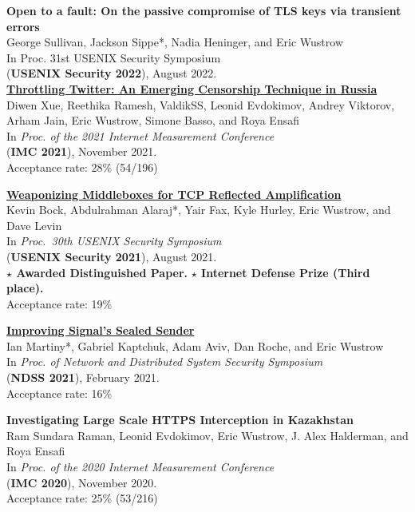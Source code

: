 \documentclass[margin,11pt]{res} %
\begin{document}
    \textbf{Open to a fault: On the passive compromise of TLS keys via transient errors} \\
    George Sullivan, Jackson Sippe*, Nadia Heninger, and Eric Wustrow \\
    In {Proc. 31st USENIX Security Symposium} \\
    (\textbf{USENIX Security 2022}), August 2022. \\


    \textbf{\href{https://throttletwitter.com/}{Throttling Twitter: An Emerging Censorship Technique in Russia}} \\
    Diwen Xue, Reethika Ramesh, ValdikSS, Leonid Evdokimov, Andrey Viktorov, Arham Jain, Eric Wustrow, Simone Basso, and Roya Ensafi \\
    In \emph{Proc. of the 2021 Internet Measurement Conference} \\
    (\textbf{IMC 2021}), November 2021. \\
    Acceptance rate: 28\% (54/196)

    \textbf{\href{https://geneva.cs.umd.edu/posts/usenix21-weaponizing-censors/}{Weaponizing Middleboxes for TCP Reflected Amplification}} \\
    Kevin Bock, Abdulrahman Alaraj*, Yair Fax, Kyle Hurley, Eric Wustrow, and Dave Levin \\
    In \emph{Proc.\ 30th USENIX Security Symposium} \\
    (\textbf{USENIX Security 2021}), August 2021. \\
    \textbf{$\star$ Awarded Distinguished Paper.} 
    \textbf{$\star$ Internet Defense Prize (Third place).} \\
    Acceptance rate: 19\% %

    \textbf{\href{https://www.ndss-symposium.org/ndss-paper/improving-signals-sealed-sender/}{Improving Signal's Sealed Sender}} \\
    Ian Martiny*, Gabriel Kaptchuk, Adam Aviv, Dan Roche, and Eric Wustrow \\
    In \emph{Proc. of Network and Distributed System Security Symposium} \\
    (\textbf{NDSS 2021}), February 2021. \\
    Acceptance rate: 16\% %

    \textbf{Investigating Large Scale HTTPS Interception in Kazakhstan} \\
    Ram Sundara Raman, Leonid Evdokimov, Eric Wustrow, J. Alex Halderman, and Roya Ensafi \\
    In \emph{Proc. of the 2020 Internet Measurement Conference} \\
    (\textbf{IMC 2020}), November 2020. \\
    Acceptance rate: 25\% (53/216)
\end{document}
